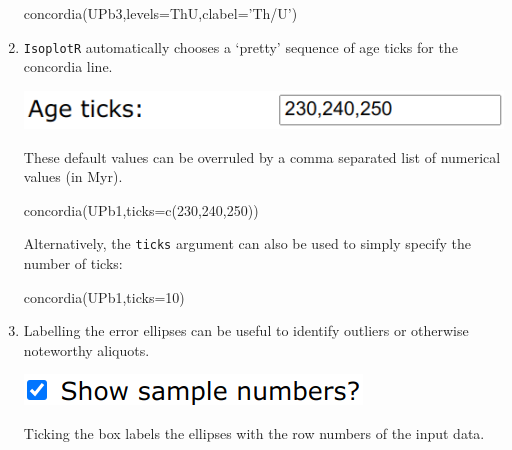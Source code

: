 \begin{refsection}
\begin{enumerate}
\begin{console}
concordia(UPb3,levels=ThU,clabel='Th/U')
\end{console}

\item \texttt{IsoplotR} automatically chooses a `pretty' sequence of
  age ticks for the concordia line.

  \noindent\begin{minipage}[t]{.4\linewidth}
  \strut\vspace*{-\baselineskip}\newline
  \includegraphics[width=\linewidth]{../figures/Concordiatticks.png}
\end{minipage}
\begin{minipage}[t]{.6\linewidth}
  These default values can be overruled by a comma separated list of
  numerical values (in Myr).
\end{minipage}

\begin{console}
concordia(UPb1,ticks=c(230,240,250))
\end{console}

Alternatively, the \texttt{ticks} argument can also be used to simply
specify the number of ticks:

\begin{console}
concordia(UPb1,ticks=10)
\end{console}

\item Labelling the error ellipses can be useful to identify outliers
  or otherwise noteworthy aliquots.

  \noindent\begin{minipage}[t]{.25\linewidth}
  \strut\vspace*{-\baselineskip}\newline
  \includegraphics[width=\linewidth]{../figures/concordiashownumbers.png}
\end{minipage}
\begin{minipage}[t]{.75\linewidth}
  Ticking the box labels the ellipses with the row numbers of the
  input data.
\end{minipage}


\end{enumerate}
\end{refsection}
